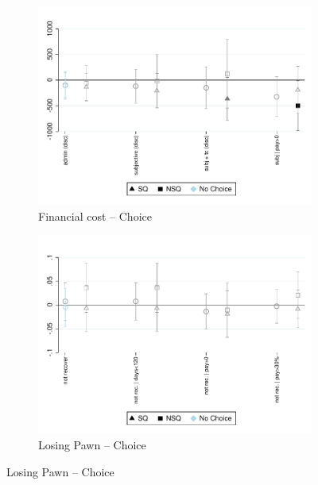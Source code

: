 \documentclass[11pt]{article}
\begin{document}
\begin{figure}[H]
\begin{center}
    \bigskip
    \bigskip
    
        \begin{subfigure}{0.45\textwidth}
        \caption{Financial cost -- Choice}
        \centering
        \includegraphics[width=\textwidth]{Figuras/fc_te_pro_5.pdf}
    \end{subfigure}
    \begin{subfigure}{0.45\textwidth}
        \caption{Losing Pawn -- Choice}
        \centering
        \includegraphics[width=\textwidth]{Figuras/def_te_pro_5.pdf}
    \end{subfigure}
    

\end{center}
\end{figure}
\end{document}
